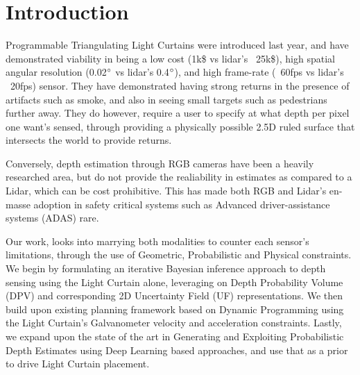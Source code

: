 \documentclass[review]{cvpr}
\begin{document}
\section{Introduction}

Programmable Triangulating Light Curtains were introduced last year, and have demonstrated viability in being a low cost (1k\$ vs lidar's ~25k\$), high spatial angular resolution (0.02$\degree$ vs lidar's  0.4$\degree$), and high frame-rate (~60fps vs lidar's ~20fps) sensor. They have demonstrated having strong returns in the presence of artifacts such as smoke, and also in seeing small targets such as pedestrians further away. They do however, require a user to specify at what depth per pixel one want's sensed, through providing a physically possible 2.5D ruled surface that intersects the world to provide returns. 

Conversely, depth estimation through RGB cameras have been a heavily researched area, but do not provide the realiability in estimates as compared to a Lidar, which can be cost prohibitive. This has made both RGB and Lidar's en-masse adoption in safety critical systems such as Advanced driver-assistance systems (ADAS) rare. 

Our work, looks into marrying both modalities to counter each sensor's limitations, through the use of Geometric, Probabilistic and Physical constraints. We begin by formulating an iterative Bayesian inference approach to depth sensing using the Light Curtain alone, leveraging on Depth Probability Volume (DPV) and corresponding 2D Uncertainty Field (UF) representations. We then build upon existing planning framework based on Dynamic Programming using the Light Curtain's Galvanometer velocity and acceleration constraints. Lastly, we expand upon the state of the art in Generating and Exploiting Probabilistic Depth Estimates using Deep Learning based approaches, and use that as a prior to drive Light Curtain placement.






\iffalse
Adaptive Sensing Formulation (say Light Curtain Only)
   Simulator
   3D Tensor to store Depth (initialization)
   Ray 2D Projection into Flat Plane
   Planning Formulation/Strategies Default/M1
   Probabilistic Formulation (Inverted Gaussian Model)
   Experiments (show Sim vs Real world, Indoor vs Outdoor):
      Basic Sweep visualization (sanity check)
      Prior sweeping approach
      Non Inverted vs Inverted
      STD encoding the uncertaintiy etc.
      Default vs M1 (and diff strategies)
   Having a Prior Depth (what if we had)
   Experiments here
         Show convergence speed/accuracy etc.
\fi

{\small


}
\end{document}
